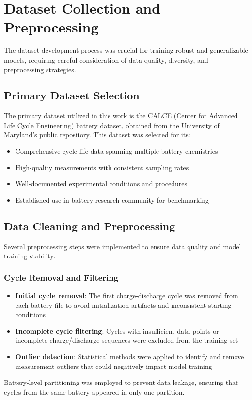 \section{Dataset Collection and Preprocessing}

The dataset development process was crucial for training robust and generalizable models, requiring careful consideration of data quality, diversity, and preprocessing strategies.

\subsection{Primary Dataset Selection}

The primary dataset utilized in this work is the CALCE (Center for Advanced Life Cycle Engineering) battery dataset, obtained from the University of Maryland's public repository. This dataset was selected for its:

\begin{itemize}
    \item Comprehensive cycle life data spanning multiple battery chemistries
    \item High-quality measurements with consistent sampling rates
    \item Well-documented experimental conditions and procedures
    \item Established use in battery research community for benchmarking
\end{itemize}

\subsection{Data Cleaning and Preprocessing}

Several preprocessing steps were implemented to ensure data quality and model training stability:

\subsubsection{Cycle Removal and Filtering}

\begin{itemize}
    \item \textbf{Initial cycle removal}: The first charge-discharge cycle was removed from each battery file to avoid initialization artifacts and inconsistent starting conditions
    \item \textbf{Incomplete cycle filtering}: Cycles with insufficient data points or incomplete charge/discharge sequences were excluded from the training set
    \item \textbf{Outlier detection}: Statistical methods were applied to identify and remove measurement outliers that could negatively impact model training
\end{itemize}
Battery-level partitioning was employed to prevent data leakage, ensuring that cycles from the same battery appeared in only one partition.

